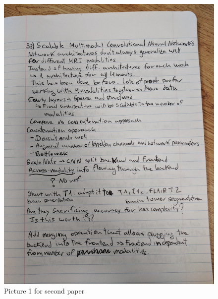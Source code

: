 \documentclass{article}
\begin{document}
\begin{figure}[h!]
\centering
\includegraphics[width=12cm]{paper2_1.jpg}
\caption{Picture 1 for second paper}
\label{fig:paper2_1}
\end{figure}
\end{document}
